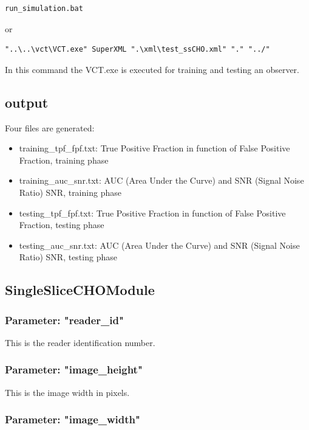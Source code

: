 \lstset{language=C++}
\begin{lstlisting}
run_simulation.bat
\end{lstlisting}

or 

\lstset{language=C++}
\begin{lstlisting}
"..\..\vct\VCT.exe" SuperXML ".\xml\test_ssCHO.xml" "." "../"
\end{lstlisting}

In this command the VCT.exe is executed for training and testing an observer.

\subsection{output}

Four files are generated:

\begin{itemize}
\item training\_tpf\_fpf.txt: True Positive Fraction in function of False Positive Fraction, training phase
\item training\_auc\_snr.txt: AUC (Area Under the Curve) and SNR (Signal Noise Ratio) SNR, training phase
\item testing\_tpf\_fpf.txt: True Positive Fraction in function of False Positive Fraction, testing phase
\item testing\_auc\_snr.txt: AUC (Area Under the Curve) and SNR (Signal Noise Ratio) SNR, testing phase
\end{itemize}

\subsection{SingleSliceCHOModule}

\subsubsection{Parameter: "reader\_id"}

This is the reader identification number.

\subsubsection{Parameter: "image\_height"}

This is the image width in pixels.

\subsubsection{Parameter: "image\_width"}

